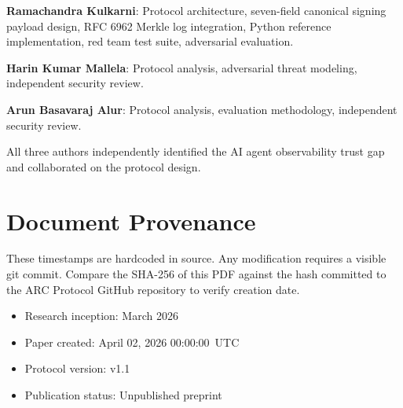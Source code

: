 \documentclass[10pt,twocolumn]{article}
\begin{document}
\textbf{Ramachandra Kulkarni}: Protocol architecture, seven-field canonical
signing payload design, RFC 6962 Merkle log integration, Python reference
implementation, red team test suite, adversarial evaluation.

\textbf{Harin Kumar Mallela}: Protocol analysis, adversarial threat modeling,
independent security review.

\textbf{Arun Basavaraj Alur}: Protocol analysis, evaluation methodology,
independent security review.

All three authors independently identified the AI agent observability trust gap
and collaborated on the protocol design.

\section*{Document Provenance}

These timestamps are hardcoded in source. Any modification requires a visible
git commit. Compare the SHA-256 of this PDF against the hash committed to the
ARC Protocol GitHub repository to verify creation date.

\begin{itemize}[noitemsep,topsep=2pt]
  \item Research inception: March 2026
  \item Paper created: April 02, 2026 00:00:00~UTC
  \item Protocol version: v1.1
  \item Publication status: Unpublished preprint
\end{itemize}
\end{document}
